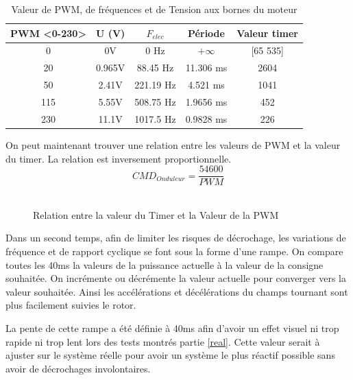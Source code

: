			\begin{table}[h]
			\centering
			\begin{center}
			\begin{tabular}{|c|c|c|c|c|}
			PWM <0-230> & U (V) & $F_{elec}$ & Période & Valeur timer \\ 
			\hline 
			0 & 0V & 0 Hz & $+\infty$ &  [65 535]\\ 
			20 & 0.965V &  88.45 Hz & 11.306 ms & 2604\\ 
			50 & 2.41V &  221.19 Hz & 4.521 ms & 1041\\ 
			115 & 5.55V & 508.75 Hz & 1.9656 ms & 452\\ 
			230 & 11.1V & 1017.5 Hz & 0.9828 ms & 226\\ 
			\end{tabular} 
			\end{center}
			\caption{Valeur de PWM, de fréquences et de Tension aux bornes du moteur}
			\label{per}
			\end{table}
			On peut maintenant trouver une relation entre les valeurs de PWM et la valeur du timer. La relation est inversement proportionnelle. 
			$$CMD_{Onduleur}=\frac{54600}{PWM}$$\\
			\begin{figure}[!h]
			\centering
				\caption{Relation entre la valeur du Timer et la Valeur de la PWM}
			\end{figure}		
			\newpage
			Dans un second temps, afin de limiter les risques de décrochage, les variations de fréquence et de rapport cyclique se font sous la forme d'une rampe. On compare toutes les 40ms la valeurs de la puissance actuelle à la valeur de la consigne souhaitée. On incrémente ou décrémente la valeur actuelle pour converger vers la valeur souhaitée. Ainsi les accélérations et décélérations du champs tournant sont plus facilement suivies le rotor.
			 \begin{tcolorbox}[center,width=0.9\textwidth, colframe=red!90!orange, colback=orange!25, arc=3mm,boxrule=1mm, sharp corners=east,title=Note]
			La pente de cette rampe a été définie à 40ms afin d'avoir un effet visuel ni trop rapide ni trop lent lors des tests montrés partie \ref{real}. Cette valeur serait à ajuster sur le système réelle pour avoir un système le plus réactif possible sans avoir de décrochages involontaires.
  			\end{tcolorbox}
